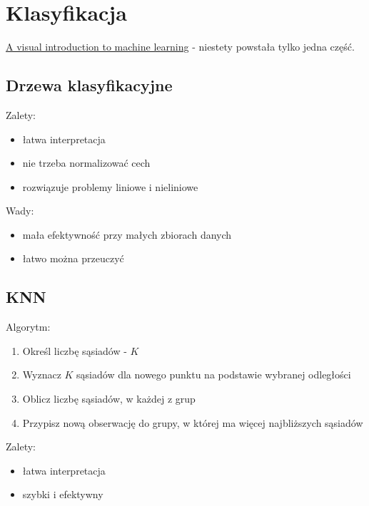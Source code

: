 \documentclass[]{book}
\providecommand{\tightlist}{%
  \setlength{\itemsep}{0pt}\setlength{\parskip}{0pt}}
\begin{document}
\chapter{Klasyfikacja}\label{klasyfikacja}

\href{http://www.r2d3.us/visual-intro-to-machine-learning-part-1/}{A
visual introduction to machine learning} - niestety powstała tylko jedna
część.

\section{Drzewa klasyfikacyjne}\label{drzewa-klasyfikacyjne}

Zalety:

\begin{itemize}
\tightlist
\item
  łatwa interpretacja
\item
  nie trzeba normalizować cech
\item
  rozwiązuje problemy liniowe i nieliniowe
\end{itemize}

Wady:

\begin{itemize}
\tightlist
\item
  mała efektywność przy małych zbiorach danych
\item
  łatwo można przeuczyć
\end{itemize}

\section{KNN}\label{knn}

Algorytm:

\begin{enumerate}
\def\labelenumi{\arabic{enumi}.}
\tightlist
\item
  Określ liczbę sąsiadów - \(K\)
\item
  Wyznacz \(K\) sąsiadów dla nowego punktu na podstawie wybranej
  odległości
\item
  Oblicz liczbę sąsiadów, w każdej z grup
\item
  Przypisz nową obserwację do grupy, w której ma więcej najbliższych
  sąsiadów
\end{enumerate}

Zalety:

\begin{itemize}
\tightlist
\item
  łatwa interpretacja
\item
  szybki i efektywny
\end{itemize}
\end{document}
